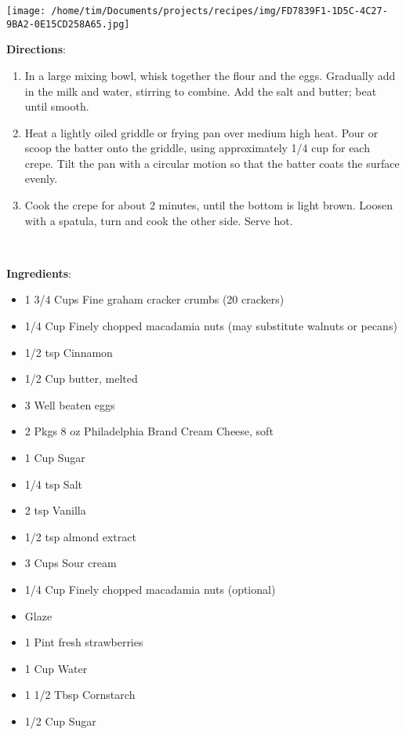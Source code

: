 \documentclass[11pt, twoside, openany]{book}
\begin{document}
\begin{minipage}[t]{0.2\linewidth}
\centering \strut\vspace*{-\baselineskip}\newline
\texttt{[image: /home/tim/Documents/projects/recipes/img/FD7839F1-1D5C-4C27-9BA2-0E15CD258A65.jpg]}\\
\end{minipage}\vspace{3mm}
\textbf{Directions}:
\vspace{-3mm}\begin{enumerate}\setlength\itemsep{-1mm}
\item In a large mixing bowl, whisk together the flour and the eggs. Gradually add in the milk and water, stirring to combine. Add the salt and butter; beat until smooth.
\item Heat a lightly oiled griddle or frying pan over medium high heat. Pour or scoop the batter onto the griddle, using approximately 1/4 cup for each crepe. Tilt the pan with a circular motion so that the batter coats the surface evenly.
\item Cook the crepe for about 2 minutes, until the bottom is light brown. Loosen with a spatula, turn and cook the other side. Serve hot.
\end{enumerate}
 \label{macadamia-nut-cheesecake}\hfill\textit{}\\
\begin{minipage}[t]{0.8\linewidth}
\textbf{Ingredients}:\vspace{-3mm}
\begin{multicols}{2}
\begin{itemize}\setlength\itemsep{-1mm}
\item 1 3/4 Cups Fine graham cracker crumbs (20 crackers)
\item 1/4 Cup Finely chopped macadamia nuts (may substitute walnuts or pecans)
\item 1/2 tsp Cinnamon
\item 1/2 Cup butter, melted
\item 3 Well beaten eggs
\item 2 Pkgs 8 oz Philadelphia Brand Cream Cheese, soft
\item 1 Cup Sugar
\item 1/4 tsp Salt
\item 2 tsp Vanilla
\item 1/2 tsp almond extract
\item 3 Cups Sour cream
\item 1/4 Cup Finely chopped macadamia nuts (optional)
\item Glaze
\item 1 Pint fresh strawberries
\item 1 Cup Water
\item 1 1/2 Tbsp Cornstarch
\item 1/2 Cup Sugar
\end{itemize}
\end{multicols}
\end{minipage}
\end{document}
